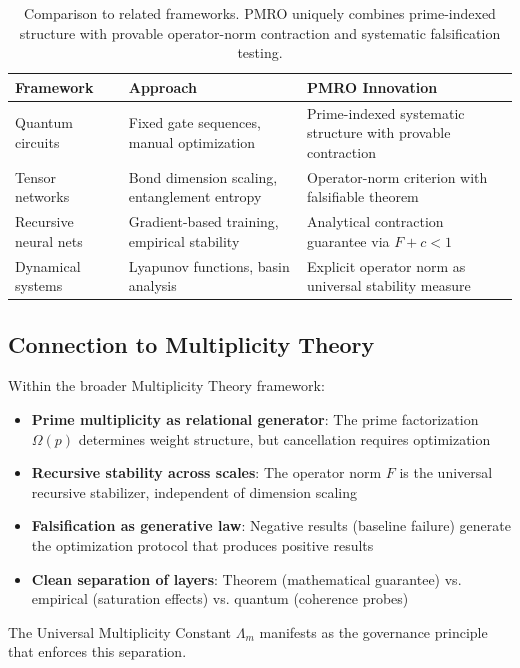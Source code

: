 \documentclass[11pt,a4paper]{article}
\begin{document}
\begin{table}[h]
\centering
\small
\begin{tabular}{p{3cm}p{5cm}p{5cm}}
\toprule
\textbf{Framework} & \textbf{Approach} & \textbf{PMRO Innovation} \\
\midrule
Quantum circuits & Fixed gate sequences, manual optimization & Prime-indexed systematic structure with provable contraction \\
Tensor networks & Bond dimension scaling, entanglement entropy & Operator-norm criterion with falsifiable theorem \\
Recursive neural nets & Gradient-based training, empirical stability & Analytical contraction guarantee via \(F+c<1\) \\
Dynamical systems & Lyapunov functions, basin analysis & Explicit operator norm as universal stability measure \\
\bottomrule
\end{tabular}
\caption{Comparison to related frameworks. PMRO uniquely combines prime-indexed structure with provable operator-norm contraction and systematic falsification testing.}
\end{table}

\subsection{Connection to Multiplicity Theory}

Within the broader Multiplicity Theory framework:

\begin{itemize}
\item \textbf{Prime multiplicity as relational generator}: The prime factorization \(\Omega(p)\) determines weight structure, but cancellation requires optimization
\item \textbf{Recursive stability across scales}: The operator norm \(F\) is the universal recursive stabilizer, independent of dimension scaling
\item \textbf{Falsification as generative law}: Negative results (baseline failure) generate the optimization protocol that produces positive results
\item \textbf{Clean separation of layers}: Theorem (mathematical guarantee) vs. empirical (saturation effects) vs. quantum (coherence probes)
\end{itemize}

The Universal Multiplicity Constant \(\Lambda_m\) manifests as the governance principle that enforces this separation.
\end{document}
